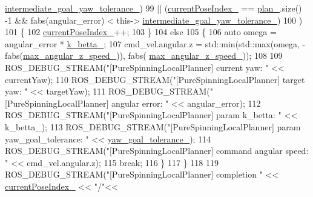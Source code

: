 \begin{DoxyCode}
      \hyperlink{classcl__move__base__z_1_1pure__spinning__local__planner_1_1PureSpinningLocalPlanner_a2e8dfda5e9dea6f09db4056aa90b2aa8}{intermediate\_goal\_yaw\_tolerance\_})
99          || (\hyperlink{classcl__move__base__z_1_1pure__spinning__local__planner_1_1PureSpinningLocalPlanner_aa0f9b4cf52a76e44dc2cfc5103d52dcd}{currentPoseIndex\_} == \hyperlink{classcl__move__base__z_1_1pure__spinning__local__planner_1_1PureSpinningLocalPlanner_a31875ee78bae4698b579e20c0754860d}{plan\_}.size() -1 && fabs(angular\_error) < this->
      \hyperlink{classcl__move__base__z_1_1pure__spinning__local__planner_1_1PureSpinningLocalPlanner_a2e8dfda5e9dea6f09db4056aa90b2aa8}{intermediate\_goal\_yaw\_tolerance\_})
100     )
101     \{
102       \hyperlink{classcl__move__base__z_1_1pure__spinning__local__planner_1_1PureSpinningLocalPlanner_aa0f9b4cf52a76e44dc2cfc5103d52dcd}{currentPoseIndex\_}++;
103     \}
104     \textcolor{keywordflow}{else}
105     \{
106       \textcolor{keyword}{auto} omega = angular\_error * \hyperlink{classcl__move__base__z_1_1pure__spinning__local__planner_1_1PureSpinningLocalPlanner_a379d2ba057231d76edd1a661d3572d68}{k\_betta\_};
107       cmd\_vel.angular.z = std::min(std::max(omega, -fabs(\hyperlink{classcl__move__base__z_1_1pure__spinning__local__planner_1_1PureSpinningLocalPlanner_a20edb2db356925684de4ee4fe03d5992}{max\_angular\_z\_speed\_})), fabs(
      \hyperlink{classcl__move__base__z_1_1pure__spinning__local__planner_1_1PureSpinningLocalPlanner_a20edb2db356925684de4ee4fe03d5992}{max\_angular\_z\_speed\_}));
108 
109       ROS\_DEBUG\_STREAM(\textcolor{stringliteral}{"[PureSpinningLocalPlanner] current yaw: "} << currentYaw);
110       ROS\_DEBUG\_STREAM(\textcolor{stringliteral}{"[PureSpinningLocalPlanner] target yaw: "} << targetYaw);
111       ROS\_DEBUG\_STREAM(\textcolor{stringliteral}{"[PureSpinningLocalPlanner] angular error: "} << angular\_error);
112       ROS\_DEBUG\_STREAM(\textcolor{stringliteral}{"[PureSpinningLocalPlanner] param k\_betta: "} << k\_betta\_);
113       ROS\_DEBUG\_STREAM(\textcolor{stringliteral}{"[PureSpinningLocalPlanner] param yaw\_goal\_tolerance: "} << 
      \hyperlink{classcl__move__base__z_1_1pure__spinning__local__planner_1_1PureSpinningLocalPlanner_a07334cd7bf29f391c2553f0038fa94e8}{yaw\_goal\_tolerance\_});
114       ROS\_DEBUG\_STREAM(\textcolor{stringliteral}{"[PureSpinningLocalPlanner] command angular speed: "} << cmd\_vel.angular.z);
115       \textcolor{keywordflow}{break};
116     \}
117   \}
118 
119   ROS\_DEBUG\_STREAM(\textcolor{stringliteral}{"[PureSpinningLocalPlanner] completion "} << \hyperlink{classcl__move__base__z_1_1pure__spinning__local__planner_1_1PureSpinningLocalPlanner_aa0f9b4cf52a76e44dc2cfc5103d52dcd}{currentPoseIndex\_} << \textcolor{stringliteral}{"/"}<< 

\end{DoxyCode}
